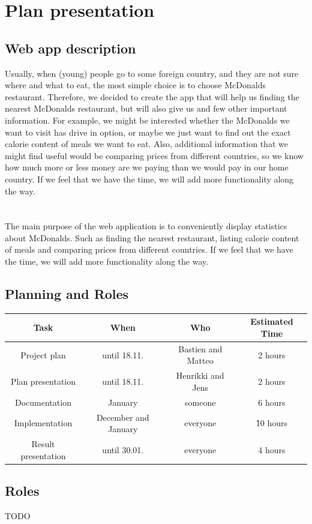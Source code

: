 \documentclass[12pt]{article}
\begin{document}
    {\color{color_section}\section{Plan presentation}}
        {\color{color_subsection}\subsection{Web app description}}
        Usually, when (young) people go to some foreign country, and they are not sure where and what to eat, the most simple choice is to choose McDonalds restaurant. Therefore, we decided to create the app that will help us finding the nearest McDonalds restaurant, but will also give us and few other important information. For example, we might be interested whether the McDonalds we want to visit has drive in option, or maybe we just want to find out the exact calorie content of meals we want to eat. Also, additional information that we might find useful would be comparing prices from different countries, so we know how much more or less money are we paying than we would pay in our home country. If we feel that we have the time, we will add more functionality along the way.\\ \\ \\
           The main purpose of the web application is to conveniently display statistics about McDonalds. Such as finding the nearest restaurant, listing calorie content of meals and comparing prices from different countries. If we feel that we have the time, we will add more functionality along the way.

        {\color{color_subsection}\subsection{Planning and Roles}}
           
	\begin{center}
	\begin{tabular}{ |c|c|c|c| } 
 	\hline
	 \textbf{Task} & \textbf{When} & \textbf{Who} & \textbf{Estimated Time}  \\
	\hline
 	Project plan & until 18.11. & Bastien and Matteo & 2 hours \\ 
 	\hline
 	Plan presentation & until 18.11. & Henrikki and Jens & 2 hours \\
 	 	\hline
 	Documentation & January & someone & 6 hours \\ 
 	 	\hline
 	Implementation & December and January & everyone & \~10 hours \\
 	 	\hline 
 	Result presentation & until 30.01. & everyone & 4 hours \\  
	 \hline
	\end{tabular}
	\end{center}
	



        {\color{color_subsection}\subsection{Roles}}
            TODO
\end{document}
